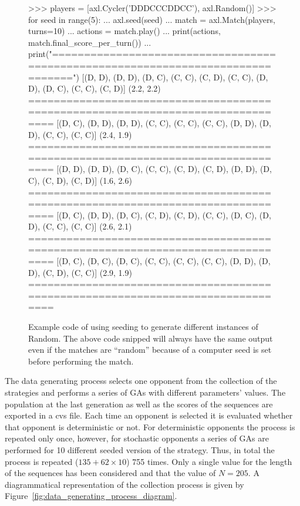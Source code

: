 \begin{figure}[!htbp]
    \begin{usagepy}
>>> players = [axl.Cycler('DDDCCCDDCC'), axl.Random()]
>>> for seed in range(5):
...   axl.seed(seed)
...   match = axl.Match(players, turns=10)
...   actions = match.play()
...   print(actions, match.final_score_per_turn())
...   print("================================================================================")
[(D, D), (D, D), (D, C), (C, C), (C, D), (C, C), (D, D), (D, C), (C, C), (C, D)] (2.2, 2.2)
================================================================================
[(D, C), (D, D), (D, D), (C, C), (C, C), (C, C), (D, D), (D, D), (C, C), (C, C)] (2.4, 1.9)
================================================================================
[(D, D), (D, D), (D, C), (C, C), (C, D), (C, D), (D, D), (D, C), (C, D), (C, D)] (1.6, 2.6)
================================================================================
[(D, C), (D, D), (D, C), (C, D), (C, D), (C, C), (D, C), (D, D), (C, C), (C, C)] (2.6, 2.1)
================================================================================
[(D, C), (D, C), (D, C), (C, C), (C, C), (C, C), (D, D), (D, D), (C, D), (C, C)] (2.9, 1.9)
================================================================================
    \end{usagepy}
\caption{Example code of using seeding to generate different instances of Random.
The above code snipped will always have the same output even if the matches are
``random'' because of a computer seed is set before performing the
match.}\label{fig:random_apl_example}
\end{figure}

The data generating process selects one opponent from the collection of the
\numberofstrategiesbestsequences strategies and performs a series of GAs with
different parameters' values. The population at the last generation as well as
the scores of the sequences are exported in a cvs file. Each time an opponent is
selected it is evaluated whether that opponent is deterministic or not. For
deterministic opponents the process is repeated only once, however, for
stochastic opponents a series of GAs are performed for 10 different seeded
version of the strategy. Thus, in total the process is repeated (\(135 + 62
\times 10\)) 755 times. Only a single value for the length of the
sequences has been considered and that the value of \(N=205\). A diagrammatical
representation of the collection process is given by
Figure~\ref{fig:data_generating_process_diagram}.

